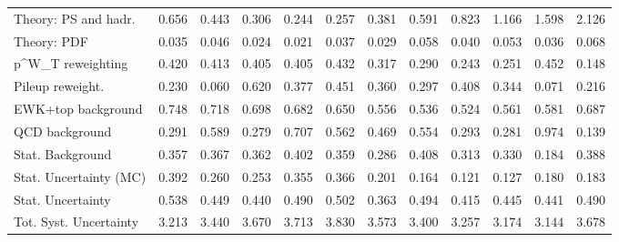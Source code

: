 \begin{tabular}{l|p{0.6cm}p{0.6cm}p{0.6cm}p{0.6cm}p{0.6cm}p{0.6cm}p{0.6cm}p{0.6cm}p{0.6cm}p{0.6cm}p{0.6cm}}
Theory: PS and hadr.                     & 0.656 & 0.443 & 0.306 & 0.244 & 0.257 & 0.381 & 0.591 & 0.823 & 1.166 & 1.598 & 2.126 \\
Theory: PDF                              & 0.035 & 0.046 & 0.024 & 0.021 & 0.037 & 0.029 & 0.058 & 0.040 & 0.053 & 0.036 & 0.068 \\
p^{W}_{T} reweighting                    & 0.420 & 0.413 & 0.405 & 0.405 & 0.432 & 0.317 & 0.290 & 0.243 & 0.251 & 0.452 & 0.148 \\
Pileup reweight.                         & 0.230 & 0.060 & 0.620 & 0.377 & 0.451 & 0.360 & 0.297 & 0.408 & 0.344 & 0.071 & 0.216 \\
EWK+top background                       & 0.748 & 0.718 & 0.698 & 0.682 & 0.650 & 0.556 & 0.536 & 0.524 & 0.561 & 0.581 & 0.687 \\
QCD background                           & 0.291 & 0.589 & 0.279 & 0.707 & 0.562 & 0.469 & 0.554 & 0.293 & 0.281 & 0.974 & 0.139 \\
Stat. Background                         & 0.357 & 0.367 & 0.362 & 0.402 & 0.359 & 0.286 & 0.408 & 0.313 & 0.330 & 0.184 & 0.388 \\
Stat. Uncertainty (MC)                   & 0.392 & 0.260 & 0.253 & 0.355 & 0.366 & 0.201 & 0.164 & 0.121 & 0.127 & 0.180 & 0.183 \\
\hline
Stat. Uncertainty                        & 0.538 & 0.449 & 0.440 & 0.490 & 0.502 & 0.363 & 0.494 & 0.415 & 0.445 & 0.441 & 0.490 \\
\hline
Tot. Syst. Uncertainty                   & 3.213 & 3.440 & 3.670 & 3.713 & 3.830 & 3.573 & 3.400 & 3.257 & 3.174 & 3.144 & 3.678 \\
\hline
\end{tabular}
